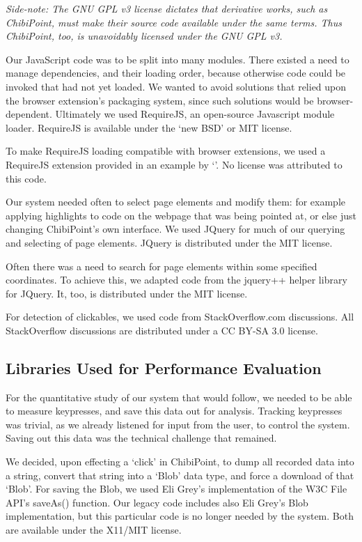 \documentclass[11pt,openright,a4paper]{report}
\begin{document}
\textit{Side-note: The GNU GPL v3 license dictates that derivative works, such as ChibiPoint, must make their source code available under the same terms. Thus ChibiPoint, too, is unavoidably licensed under the GNU GPL v3.}

Our JavaScript code was to be split into many modules. There existed a need to manage dependencies, and their loading order, because otherwise code could be invoked that had not yet loaded. We wanted to avoid solutions that relied upon the browser extension's packaging system, since such solutions would be browser-dependent. Ultimately we used RequireJS\cite{requirejs}, an open-source Javascript module loader. RequireJS is available under the `new BSD' or MIT license\cite{requirejslicense,mitlicense}.

To make RequireJS loading compatible with browser extensions, we used a RequireJS extension provided in an example by `\citeauthor{requirejscs}'\cite{requirejslicense}. No license was attributed to this code.

Our system needed often to select page elements and modify them: for example applying highlights to code on the webpage that was being pointed at, or else just changing ChibiPoint's own interface. We used JQuery\cite{jquery} for much of our querying and selecting of page elements. JQuery is distributed under the MIT license\cite{mitlicense}.

Often there was a need to search for page elements within some specified coordinates. To achieve this, we adapted code from the jquery++\cite{jquerypp} helper library for JQuery. It, too, is distributed under the MIT license\cite{mitlicense}.

For detection of clickables, we used code from StackOverflow.com discussions\cite{eventlistenerprototype}. All StackOverflow discussions are distributed under a CC BY-SA 3.0 license\cite{soverflowlicense}.

\subsection{Libraries Used for Performance Evaluation}
For the quantitative study of our system that would follow, we needed to be able to measure keypresses, and save this data out for analysis. Tracking keypresses was trivial, as we already listened for input from the user, to control the system. Saving out this data was the technical challenge that remained.

We decided, upon effecting a `click' in ChibiPoint, to dump all recorded data into a string, convert that string into a `Blob' data type, and force a download of that `Blob'. For saving the Blob, we used Eli Grey's implementation of the W3C File API's saveAs() function\cite{filesaver}. Our legacy code includes also Eli Grey's Blob implementation\cite{blob}, but this particular code is no longer needed by the system. Both are available under the X11/MIT license\cite{x11license}.
\end{document}
